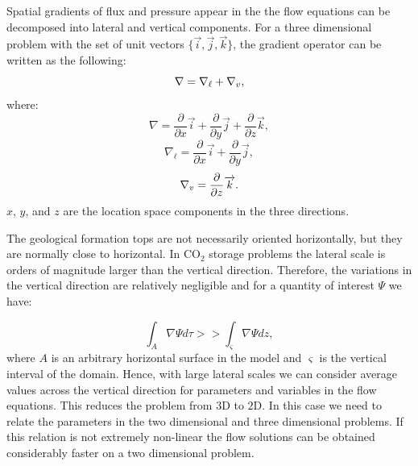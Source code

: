 Spatial gradients of flux and pressure appear in the the flow equations can be
decomposed into lateral and vertical components. For a three dimensional
problem with the set of unit vectors
$\{\overrightarrow{i},\overrightarrow{j},\overrightarrow{k}\}$, the gradient
operator can be written as the following:
\begin{equation}
    \nabla = \nabla_{\ell} + \nabla_{\\v},
    \label{eq:grd}
\end{equation} where:
\begin{equation}
    \nabla = \frac{\partial}{\partial x}\overrightarrow{i} +
\frac{\partial}{\partial y}\overrightarrow{j} +
\frac{\partial}{\partial z}\overrightarrow{k},
    \label{eq:grdc}
\end{equation}
\begin{equation}
    \nabla_{\ell} = \frac{\partial}{\partial x}\overrightarrow{i} +
\frac{\partial}{\partial y}\overrightarrow{j},
    \label{eq:grdpllc}
\end{equation}
\begin{equation}
    \nabla_{\\v} = \frac{\partial}{\partial z}\overrightarrow{k}.
    \label{eq:grdvrtc}
\end{equation} $x$, $y$, and $z$ are the location space components in the three
directions.


The geological formation tops are not necessarily oriented horizontally, but
they
are normally close to horizontal. In $\mbox{CO}_2$ storage problems the lateral
scale is
orders of magnitude larger than the vertical direction. Therefore, the
variations in the vertical direction are relatively negligible and for a
quantity of interest $\Psi$ we have:

\begin{equation}
 \int_{A}\nabla\Psi d\tau >> \int_{\varsigma}\nabla\Psi dz, 
 \label{eq:intPsi}
\end{equation} where $A$ is an arbitrary horizontal surface in the model and
$\varsigma$ is the vertical interval of the domain. Hence, with large lateral
scales we can consider average values across the vertical direction for
parameters and variables in the flow equations. This reduces the problem from
$3\mbox{D}$ to $2\mbox{D}$. In this case we need to relate the parameters in
the two dimensional and three dimensional problems. If this relation is not
extremely non-linear the flow solutions can be obtained considerably faster on
a two dimensional problem.

